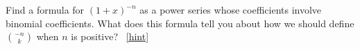 \documentclass{book}
\begin{document}
\setcounter{project}{253}
\addtocounter{project}{-1}
\begin{activity}[]\label{negnchoosek}
\hypertarget{p-1357}{}%
Find a formula for \((1+x)^{-n}\) as a power series whose coefficients involve binomial coefficients. What does this formula tell you about how we should define \(\binom{-n}{k}\) when \(n\) is positive?%
~\hfill{\tiny\hyperlink{a-253}{[hint]}\hypertarget{q-253}{}}\end{activity}
\end{document}
